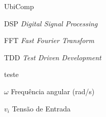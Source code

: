 \documentclass[tg]{mdtufsm}
\begin{document}
\begin{listofabbrv}{UbiComp}
\item [DSP] \textit{Digital Signal Processing}
\item[FFT] \textit{Fast Fourier Transform}
\item[TDD] \textit{Test Driven Development}
\end{listofabbrv}


\begin{listofsymbols}{teste}
\item [$\omega$] Frequência angular (rad/s)
\item [$v_i$] Tensão de Entrada
\end{listofsymbols}

\tableofcontents


\setlength{\baselineskip}{1.5\baselineskip}








\setlength{\baselineskip}{\baselineskip}

%
%



%
%
\end{document}
